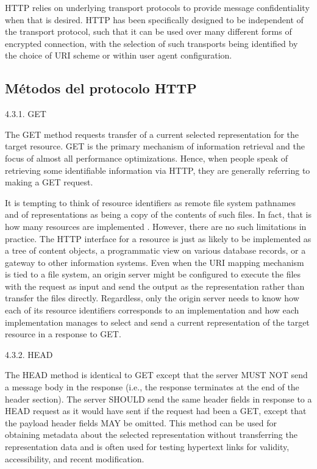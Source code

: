 HTTP relies on underlying transport protocols to provide message
confidentiality when that is desired.  HTTP has been specifically
designed to be independent of the transport protocol, such that it
can be used over many different forms of encrypted connection, with
the selection of such transports being identified by the choice of
URI scheme or within user agent configuration.


\subsection{Métodos del protocolo HTTP}
4.3.1.  GET

   The GET method requests transfer of a current selected representation
   for the target resource.  GET is the primary mechanism of information
   retrieval and the focus of almost all performance optimizations.
   Hence, when people speak of retrieving some identifiable information
   via HTTP, they are generally referring to making a GET request.

   It is tempting to think of resource identifiers as remote file system
   pathnames and of representations as being a copy of the contents of
   such files.  In fact, that is how many resources are implemented 
   .  However, there are
   no such limitations in practice.  The HTTP interface for a resource
   is just as likely to be implemented as a tree of content objects, a
   programmatic view on various database records, or a gateway to other
   information systems.  Even when the URI mapping mechanism is tied to
   a file system, an origin server might be configured to execute the
   files with the request as input and send the output as the
   representation rather than transfer the files directly.  Regardless,
   only the origin server needs to know how each of its resource
   identifiers corresponds to an implementation and how each
   implementation manages to select and send a current representation of
   the target resource in a response to GET.

  

4.3.2.  HEAD

   The HEAD method is identical to GET except that the server MUST NOT
   send a message body in the response (i.e., the response terminates at
   the end of the header section).  The server SHOULD send the same
   header fields in response to a HEAD request as it would have sent if
   the request had been a GET, except that the payload header fields
    MAY be omitted.  This method can be used for obtaining
   metadata about the selected representation without transferring the
   representation data and is often used for testing hypertext links for
   validity, accessibility, and recent modification.

